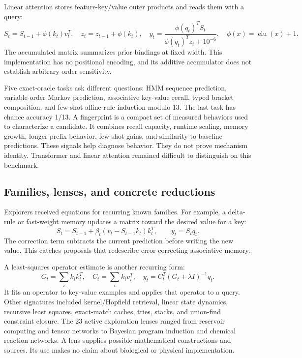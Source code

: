 Linear attention stores feature-key/value outer products and reads them with a query:
\begin{equation}
S_t=S_{t-1}+\phi(k_t)v_t^T,\quad z_t=z_{t-1}+\phi(k_t),\quad y_t=\frac{\phi(q_t)^TS_t}{\phi(q_t)^Tz_t+10^{-6}},\quad \phi(x)=\operatorname{elu}(x)+1.
\end{equation}
The accumulated matrix summarizes prior bindings at fixed width. This implementation has no positional encoding, and its additive accumulator does not establish arbitrary order sensitivity.

Five exact-oracle tasks ask different questions: HMM sequence prediction, variable-order Markov prediction, associative key-value recall, typed bracket composition, and few-shot affine-rule induction modulo 13. The last task has chance accuracy 1/13. A fingerprint is a compact set of measured behaviors used to characterize a candidate. It combines recall capacity, runtime scaling, memory growth, longer-prefix behavior, few-shot gains, and similarity to baseline predictions. These signals help diagnose behavior. They do not prove mechanism identity. Transformer and linear attention remained difficult to distinguish on this benchmark.

\subsection{Families, lenses, and concrete reductions}

Explorers received equations for recurring known families. For example, a delta-rule or fast-weight memory updates a matrix toward the desired value for a key:
\begin{equation}
S_t=S_{t-1}+\beta_t(v_t-S_{t-1}k_t)k_t^T,\qquad y_t=S_tq_t.
\end{equation}
The correction term subtracts the current prediction before writing the new value. This catches proposals that redescribe error-correcting associative memory.

A least-squares operator estimate is another recurring form:
\begin{equation}
G_t=\sum_i k_ik_i^T,\quad C_t=\sum_i k_iv_i^T,\quad y_t=C_t^T(G_t+\lambda I)^{-1}q_t.
\end{equation}
It fits an operator to key-value examples and applies that operator to a query. Other signatures included kernel/Hopfield retrieval, linear state dynamics, recursive least squares, exact-match caches, tries, stacks, and union-find constraint closure. The 23 active exploration lenses ranged from reservoir computing and tensor networks to Bayesian program induction and chemical reaction networks. A lens supplies possible mathematical constructions and sources. Its use makes no claim about biological or physical implementation.

